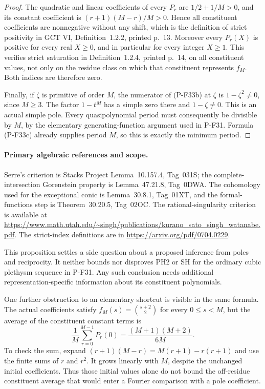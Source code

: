 \begin{proof}
The quadratic and linear coefficients of every
$P_r$ are $1/2+1/M>0$, and its constant coefficient
is $(r+1)(M-r)/M>0$. Hence all constituent coefficients
are nonnegative without any shift, which is the
definition of strict positivity in GCT VI,
Definition~1.2.2, printed p.~13. Moreover every
$P_r(X)$ is positive for every real $X\ge0$,
and in particular for every integer $X\ge1$.
This verifies strict saturation in Definition~1.2.4,
printed p.~14, on all constituent values, not only
on the residue class on which that constituent
represents $f_M$. Both indices are therefore zero.

Finally, if $\zeta$ is primitive of order $M$,
the numerator of (P-F33b) at $\zeta$ is
$1-\zeta^2\ne0$, since $M\ge3$.
The factor $1-t^M$ has a simple zero there
and $1-\zeta\ne0$. This is an actual simple pole.
Every quasipolynomial period must consequently
be divisible by $M$, by the elementary
generating-function argument used in P-F31.
Formula (P-F33c) already supplies period $M$,
so this is exactly the minimum period.
\end{proof}

\paragraph{Primary algebraic references and scope.}
Serre's criterion is Stacks Project
Lemma~10.157.4, Tag~031S; the complete-intersection
Gorenstein property is Lemma~47.21.8, Tag~0DWA.
The cohomology used for the exceptional conic is
Lemma~30.8.1, Tag~01XT, and the formal-functions
step is Theorem~30.20.5, Tag~02OC.
The rational-singularity criterion is available at
\url{https://www.math.utah.edu/~singh/publications/kurano_sato_singh_watanabe.pdf}.
The strict-index definitions are in
\url{https://arxiv.org/pdf/0704.0229}.

This proposition settles a side question about a
proposed inference from poles and reciprocity.
It neither bounds nor disproves PH2 or SH for the
ordinary cubic plethysm sequence in P-F31.
Any such conclusion needs additional
representation-specific information about its
constituent polynomials.

One further obstruction to an elementary shortcut is
visible in the same formula. The actual coefficients
satisfy $f_M(s)=\binom{s+2}{2}$ for every $0\le s<M$,
but the average of the constituent constant terms is
\[
 \frac1M\sum_{r=0}^{M-1}P_r(0)
       =\frac{(M+1)(M+2)}{6M}.
 \tag{P-F33j}
\]
To check the sum, expand
$(r+1)(M-r)=M(r+1)-r(r+1)$ and use
the finite sums of $r$ and $r^2$.
It grows linearly with $M$, despite the unchanged
initial coefficients. Thus those initial values alone
do not bound the off-residue constituent average
that would enter a Fourier comparison with a pole
coefficient.
